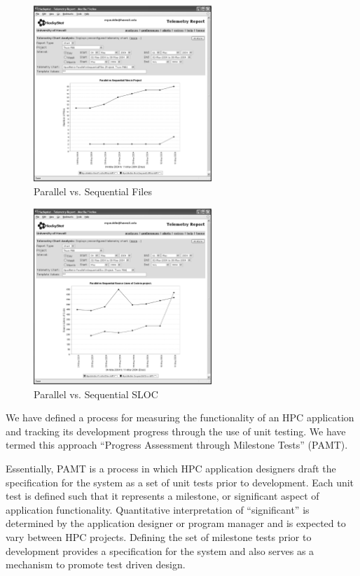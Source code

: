 \documentclass[10pt,twocolumn]{article}
\begin{document}
\begin{figure}[htpb]
  \centering
  \includegraphics[width=0.60\textwidth]{truss.parallelfiles.eps}
  \caption{Parallel vs. Sequential Files}
  \label{fig:parallelfiles}
\end{figure}

\begin{figure}[htpb]
  \centering
  \includegraphics[width=0.60\textwidth]{truss.parallelvsequential.eps}
  \caption{Parallel vs. Sequential SLOC}
  \label{fig:parallelvsequential}
\end{figure}


We have defined a process for measuring the functionality of an HPC
application and tracking its development progress through the use of unit
testing.  We have termed this approach ``Progress Assessment through
Milestone Tests'' (PAMT).

Essentially, PAMT is a process in which HPC application designers draft
the specification for the system as a set of unit tests prior to
development.  Each unit test is defined such that it represents a
milestone, or significant aspect of application functionality.
Quantitative interpretation of ``significant'' is determined by the
application designer or program manager and is expected to vary between
HPC projects.  Defining the set of milestone tests prior to development
provides a specification for the system and also serves as a mechanism to
promote test driven design.
\end{document}
